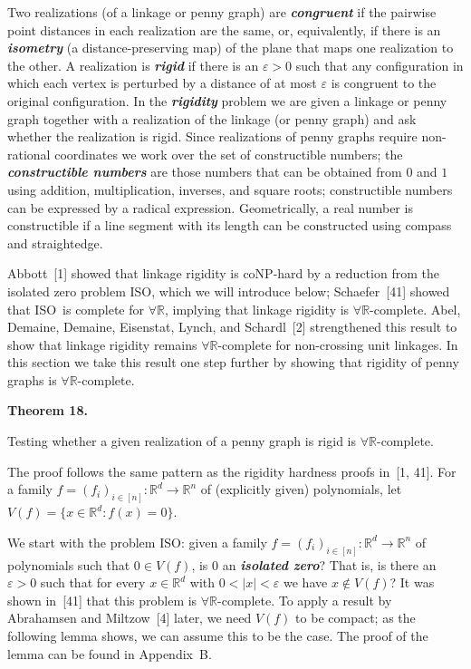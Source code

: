 \documentclass{article}
\newcommand{\defn}[1]{\textit{\textbf{\boldmath #1}}}
\begin{document}
Two realizations (of a linkage or penny graph) are \defn{congruent} if  the pairwise point distances in each realization are the same,
or, equivalently, if there is an \defn{isometry} (a distance-preserving map) of the plane that maps one realization to the other. A realization is \defn{rigid} if there is an $\varepsilon > 0$ such that any configuration in which each vertex is perturbed by a distance of at most $\varepsilon$ is congruent to the original configuration. In the \defn{rigidity} problem we are given a linkage or penny graph together with a realization of the linkage (or penny graph) and ask whether the realization is rigid. Since realizations of penny graphs require non-rational coordinates we work 
over the set of constructible numbers; the \defn{constructible numbers} are those numbers that can be obtained from $0$ and $1$ using addition, multiplication, inverses, and square roots; constructible numbers can be expressed by a radical expression. Geometrically, a real number is constructible if a line segment with its length can be constructed using compass and straightedge. 

Abbott~[1] showed that linkage rigidity is \textsf{coNP}-hard by a reduction from the isolated zero problem \textnormal{\textsc{ISO}}, which we will introduce below; Schaefer~[41] showed that \textnormal{\textsc{ISO}}\ is complete for \ensuremath{\forall\mathbb{R}}, implying that linkage rigidity is \ensuremath{\forall\mathbb{R}}-complete. Abel, Demaine, Demaine, Eisenstat, Lynch, and Schardl~[2] strengthened this result to show that linkage rigidity remains \ensuremath{\forall\mathbb{R}}-complete for non-crossing unit linkages. In this section we take this result one step further by showing that rigidity of penny graphs is \ensuremath{\forall\mathbb{R}}-complete.

\par\medskip\noindent\textbf{Theorem 18.} \begin{itshape}
 Testing whether a given realization of a penny graph is rigid is \ensuremath{\forall\mathbb{R}}-complete.
\end{itshape}\par\medskip

The proof follows the same pattern as the rigidity hardness proofs in~[1, 41]. For a family $f = (f_i)_{i \in [n]}: \ensuremath{\mathbb{R}}^d \rightarrow \ensuremath{\mathbb{R}}^n$ of (explicitly given) polynomials, let $V(f) = \{x \in \ensuremath{\mathbb{R}}^d: f(x) = 0\}$.

We start with the problem \textnormal{\textsc{ISO}}: given a family $f = (f_i)_{i \in [n]}: \ensuremath{\mathbb{R}}^d \rightarrow \ensuremath{\mathbb{R}}^n$ of polynomials such that $0 \in V(f)$, is $0$ an \defn{isolated zero}? That is, is there an $\varepsilon > 0$ such that for every $x \in \ensuremath{\mathbb{R}}^d$ with $0 < \lvert x \rvert < \varepsilon$ we have $x \not\in V(f)$? It was shown in~[41] that this problem is \ensuremath{\forall\mathbb{R}}-complete. To apply a result by Abrahamsen and Miltzow~[4] later, we need $V(f)$ to be compact; as the following lemma shows, we can assume this to be the case. The proof of the lemma can be found in Appendix~B.
\end{document}
